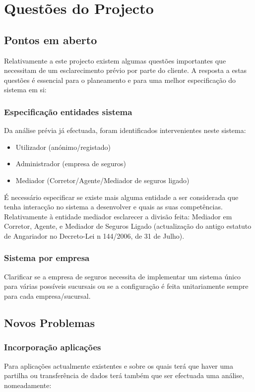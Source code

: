 \chapter{Questões do Projecto}
\minitoc
\section{Pontos em aberto}
Relativamente a este projecto existem algumas questões importantes que necessitam de um esclarecimento prévio por parte do cliente.
A resposta a estas questões é essencial para o planeamento e para uma melhor especificação do sistema em si:

\subsection{Especificação entidades sistema}
Da análise prévia já efectuada, foram identificados intervenientes neste sistema:

\begin{itemize} 
\item Utilizador (anónimo/registado)
\item Administrador (empresa de seguros)
\item Mediador (Corretor/Agente/Mediador de seguros ligado)
\end{itemize}

É necessário especificar se existe mais alguma entidade a ser considerada que tenha interacção no sistema a desenvolver e quais as suas competências. Relativamente à entidade mediador esclarecer a divisão feita: Mediador em Corretor, Agente, e Mediador de Seguros Ligado (actualização do antigo estatuto de Angariador no Decreto-Lei n 144/2006, de 31 de Julho).

\subsection{Sistema por empresa}
Clarificar se a empresa de seguros necessita de implementar um sistema único para várias possíveis sucursais ou se a configuração é feita unitariamente sempre para cada empresa/sucursal.


\section{Novos Problemas}

\subsection{Incorporação aplicações}
Para aplicações actualmente existentes e sobre os quais terá que haver uma partilha ou transferência de dados terá também que ser efectuada uma análise, nomeadamente:

